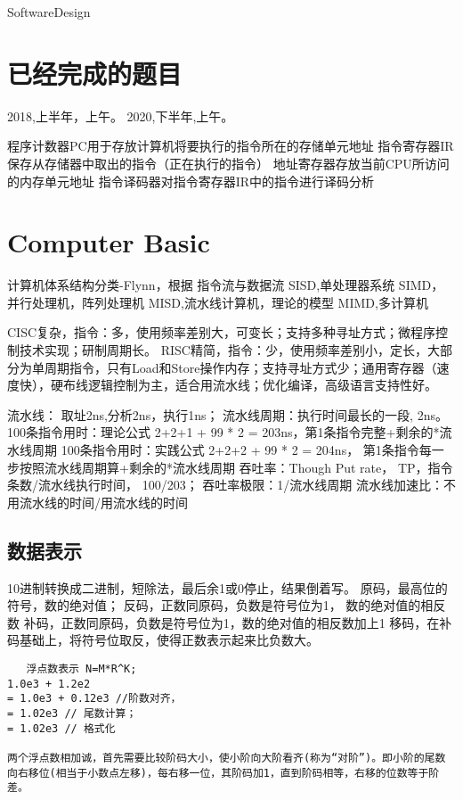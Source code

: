 \documentclass[UTF8]{article}
\begin{document}
SoftwareDesign

\section{已经完成的题目}

2018,上半年，上午。
2020,下半年,上午。


程序计数器PC用于存放计算机将要执行的指令所在的存储单元地址
指令寄存器IR保存从存储器中取出的指令（正在执行的指令）
地址寄存器存放当前CPU所访问的内存单元地址
指令译码器对指令寄存器IR中的指令进行译码分析



\section{Computer Basic}


计算机体系结构分类-Flynn，根据 指令流与数据流
SISD,单处理器系统
SIMD，并行处理机，阵列处理机
MISD,流水线计算机，理论的模型
MIMD,多计算机

CISC复杂，指令：多，使用频率差别大，可变长；支持多种寻址方式；微程序控制技术实现；研制周期长。
RISC精简，指令：少，使用频率差别小，定长，大部分为单周期指令，只有Load和Store操作内存；支持寻址方式少；通用寄存器（速度快），硬布线逻辑控制为主，适合用流水线；优化编译，高级语言支持性好。


流水线：
取址2ns,分析2ns，执行1ns；
流水线周期：执行时间最长的一段, 2ns。
100条指令用时：理论公式 2+2+1 + 99 * 2 = 203ns，第1条指令完整+剩余的*流水线周期
100条指令用时：实践公式 2+2+2 + 99 * 2 = 204ns， 第1条指令每一步按照流水线周期算+剩余的*流水线周期
吞吐率：Though Put rate， TP，指令条数/流水线执行时间， 100/203；
吞吐率极限：1/流水线周期
流水线加速比：不用流水线的时间/用流水线的时间

\subsection{数据表示}

10进制转换成二进制，短除法，最后余1或0停止，结果倒着写。
原码，最高位的符号，数的绝对值；
反码，正数同原码，负数是符号位为1， 数的绝对值的相反数
补码，正数同原码，负数是符号位为1，数的绝对值的相反数加上1
移码，在补码基础上，将符号位取反，使得正数表示起来比负数大。


\begin{lstlisting}
   浮点数表示 N=M*R^K;
1.0e3 + 1.2e2
= 1.0e3 + 0.12e3 //阶数对齐，
= 1.02e3 // 尾数计算；
= 1.02e3 // 格式化

两个浮点数相加诚，首先需要比较阶码大小，使小阶向大阶看齐(称为“对阶”)。即小阶的尾数向右移位(相当于小数点左移)，每右移一位，其阶码加1，直到阶码相等，右移的位数等于阶差。

\end{lstlisting}
\end{document}
